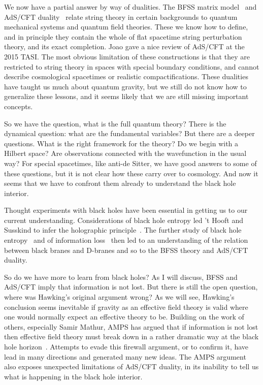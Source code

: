 \documentclass[12pt]{article}
\begin{document}
We now have a partial answer by way of dualities.  The BFSS matrix model~\cite{Banks:1996vh} and AdS/CFT duality~\cite{Maldacena:1997re,GKP,W} relate string theory in certain backgrounds to quantum mechanical systems and quantum field theories.  These we know how to define, and in principle they contain the whole of  flat spacetime string perturbation theory, and its exact completion.  Joao gave a nice review of AdS/CFT at the 2015 TASI.  The most obvious limitation of these constructions is that they are restricted to string theory in spaces with special boundary conditions, and cannot describe cosmological spacetimes or realistic compactifications.  These dualities have taught us much about quantum gravity, but we still do not know how to generalize these lessons, and it seems likely that we are still missing important concepts.

So we have the question, what is the full quantum theory?  There is the dynamical question: what are the fundamental variables?  But there are a deeper questions.  What is the right framework for the theory?  Do we begin with a Hilbert space?  Are observations connected with the wavefunction in the usual way?  
For special spacetimes, like anti-de Sitter, we have good answers to some of these questions, but it is not clear how these carry over to cosmology.  And now it seems that we have to confront them already  to understand the black hole interior.

Thought experiments with black holes have been essential in getting us to our current understanding.  Considerations of black hole entropy  led 't Hooft and Susskind to infer the holographic principle~\cite{'tHooft:1993gx,Susskind:1994vu}.  The further study of black hole entropy~\cite{Strominger:1996sh} and of information loss~\cite{Hawking:1976ra} then led to an understanding of the relation between black branes and D-branes and so to the BFSS theory and AdS/CFT duality.  

So do we have more to learn from black holes?  As I will discuss, BFSS and AdS/CFT imply that information is not lost.  But there is still the open question, where was Hawking's original argument wrong?  As we will see, Hawking's conclusion seems inevitable if gravity as an effective field theory is valid where one would normally expect an effective theory to be.  Building on the work of others, especially Samir Mathur, AMPS has argued that if information is not lost then effective field theory must break down in a rather dramatic way at the black hole horizon~\cite{Almheiri:2012rt}.  
Attempts to evade this firewall argument, or to confirm it, have lead in many directions and generated many new ideas.  The AMPS argument also exposes unexpected limitations of AdS/CFT duality, in its inability to tell us what is happening in the black hole interior.
\end{document}
